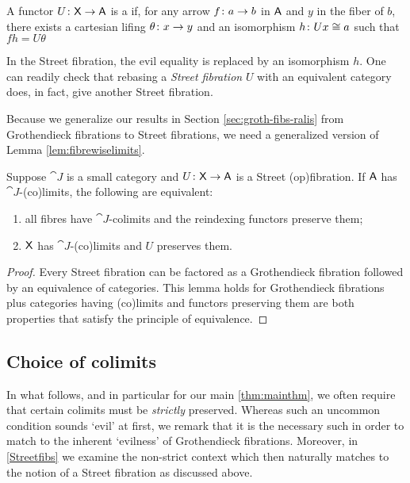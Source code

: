 \documentclass{amsart}
\begin{document}
\begin{defn}

  A functor $ U \colon \mathsf{X} \to \mathsf{A} $ is a  if, for any arrow $ f \colon a \to b $ in $ \mathsf{A}
  $ and $ y $ in the fiber of $ b $, there exists a
  cartesian lifing $ \theta \colon x \to y $ and an
  isomorphism $ h \colon Ux \cong a $ such that $ fh = U\theta $
  
\end{defn}

In the Street fibration, the evil equality is replaced by an
isomorphism $ h $.  One can readily check that rebasing a
\emph{Street fibration} $ U $ with an equivalent category
does, in fact, give another Street fibration.

Because we generalize our results in Section
\ref{sec:groth-fibs-ralis} from Grothendieck fibrations to
Street fibrations, we need a generalized version of Lemma
\ref{lem:fibrewiselimits}.

\begin{lem} \label{lem:street-fibrewise-limits}
  Suppose $ \cat{J} $ is a small category and $ U \colon \mathsf{X}
  \to \mathsf{A} $ is a Street (op)fibration. If $ \mathsf{A} $ has $ \cat{J}
  $-(co)limits, the following are equivalent:
  \begin{enumerate}
  \item
    all fibres have $ \cat{J} $-colimits and the
    reindexing functors preserve them;
  \item
    $ \mathsf{X} $ has $ \cat{J} $-(co)limits and $ U $ preserves
    them.
  \end{enumerate}
\end{lem}

\begin{proof}
  Every Street fibration can be factored as a Grothendieck
  fibration followed by an equivalence of categories.  This
  lemma holds for Grothendieck fibrations plus categories having
  (co)limits and functors preserving them are both properties
  that satisfy the principle of equivalence.  
\end{proof}

\subsection*{Choice of colimits}

In what follows, and in particular for our main \cref{thm:mainthm}, we often require that certain colimits must be \emph{strictly} preserved. Whereas such an uncommon condition sounds `evil' at first, we remark that it is the necessary such in order to match to the inherent `evilness' of Grothendieck fibrations. Moreover, in \cref{Streetfibs} we examine the non-strict context which then naturally matches to the notion of a Street fibration as discussed above.
\end{document}
